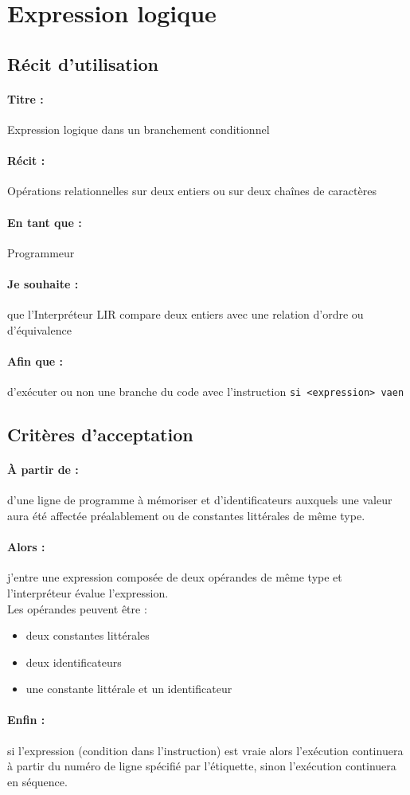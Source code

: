     \section{Expression logique}

    \subsection*{Récit d'utilisation}

    \paragraph{Titre : } Expression logique dans un branchement
    conditionnel
    \paragraph{Récit : } Opérations relationnelles sur deux entiers
                         ou sur deux chaînes de caractères
    \paragraph{En tant que : } Programmeur
    \paragraph{Je souhaite : } que l'Interpréteur LIR compare deux
    entiers avec une relation d'ordre ou d'équivalence
    \paragraph{Afin que : } d'exécuter ou non une branche du code avec
    l'instruction \verb|si <expression> vaen|

    \subsection*{Critères d'acceptation}

    \paragraph{À partir de : } d'une ligne de programme à mémoriser et d'identificateurs auxquels une valeur aura été affectée préalablement
    ou de constantes littérales de même type.

    \paragraph{Alors : } j'entre une expression composée de deux
    opérandes de même type et l'interpréteur évalue l'expression.
    \\ Les opérandes peuvent être :
    \begin{itemize}
        \item deux constantes littérales
        \item deux identificateurs
        \item une constante littérale et un identificateur
    \end{itemize}

    \paragraph{Enfin : } si l'expression (condition dans l'instruction)
    est vraie alors l'exécution continuera à partir du numéro de ligne
    spécifié par l’étiquette, sinon l'exécution continuera en séquence.